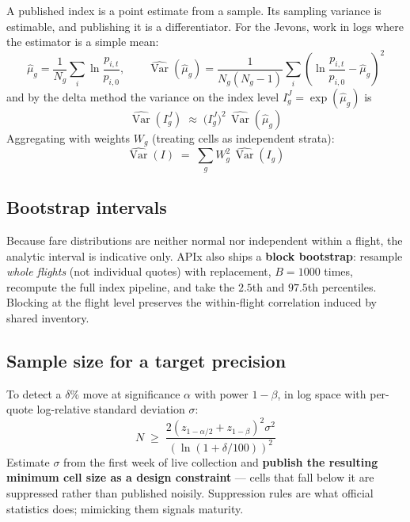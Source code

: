 A published index is a point estimate from a sample. Its sampling variance is estimable, and
publishing it is a differentiator. For the Jevons, work in logs where the estimator is a
simple mean:
\begin{equation}
\hat\mu_g = \frac{1}{N_g}\sum_{i} \ln\frac{p_{i,t}}{p_{i,0}},
\qquad
\widehat{\operatorname{Var}}(\hat\mu_g) = \frac{1}{N_g(N_g-1)}\sum_i\left(\ln\frac{p_{i,t}}{p_{i,0}} - \hat\mu_g\right)^2
\end{equation}
and by the delta method the variance on the index level $I^J_g = \exp(\hat\mu_g)$ is
\begin{equation}
\widehat{\operatorname{Var}}(I^J_g) \;\approx\; \big(I^J_g\big)^2\,\widehat{\operatorname{Var}}(\hat\mu_g)
\end{equation}
Aggregating with weights $W_g$ (treating cells as independent strata):
\begin{equation}
\widehat{\operatorname{Var}}(I) \;=\; \sum_g W_g^2\,\widehat{\operatorname{Var}}(I_g)
\end{equation}

\subsection{Bootstrap intervals}

Because fare distributions are neither normal nor independent within a flight, the
analytic interval is indicative only. APIx also ships a \textbf{block bootstrap}: resample
\emph{whole flights} (not individual quotes) with replacement, $B=1000$ times, recompute
the full index pipeline, and take the $2.5$th and $97.5$th percentiles. Blocking at the
flight level preserves the within-flight correlation induced by shared inventory.

\subsection{Sample size for a target precision}

To detect a $\delta\%$ move at significance $\alpha$ with power $1-\beta$, in log space with
per-quote log-relative standard deviation $\sigma$:
\begin{equation}
N \;\geq\; \frac{2\left(z_{1-\alpha/2}+z_{1-\beta}\right)^2\sigma^2}{\left(\ln(1+\delta/100)\right)^2}
\end{equation}
Estimate $\sigma$ from the first week of live collection and \textbf{publish the resulting
minimum cell size as a design constraint} --- cells that fall below it are suppressed rather
than published noisily. Suppression rules are what official statistics does; mimicking them
signals maturity.
